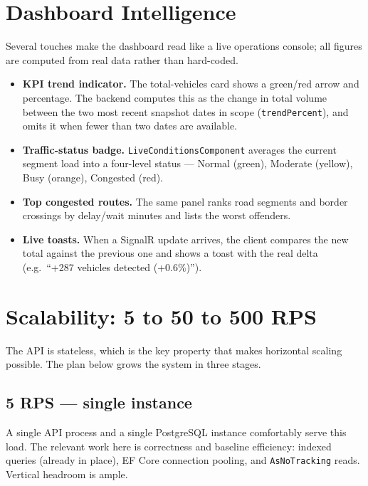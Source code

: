 \documentclass[11pt,a4paper]{article}
\newcommand{\code}[1]{\texttt{\small #1}}
\begin{document}
\section{Dashboard Intelligence}
Several touches make the dashboard read like a live operations console; all
figures are computed from real data rather than hard-coded.

\begin{itemize}[noitemsep]
  \item \textbf{KPI trend indicator.} The total-vehicles card shows a green/red
        arrow and percentage. The backend computes this as the change in total
        volume between the two most recent snapshot dates in scope
        (\code{trendPercent}), and omits it when fewer than two dates are
        available.
  \item \textbf{Traffic-status badge.} \code{LiveConditionsComponent} averages
        the current segment load into a four-level status --- Normal (green),
        Moderate (yellow), Busy (orange), Congested (red).
  \item \textbf{Top congested routes.} The same panel ranks road segments and
        border crossings by delay/wait minutes and lists the worst offenders.
  \item \textbf{Live toasts.} When a SignalR update arrives, the client compares
        the new total against the previous one and shows a toast with the real
        delta (e.g.\ ``+287 vehicles detected (+0.6\%)'').
\end{itemize}

\section{Scalability: 5 to 50 to 500 RPS}
The API is stateless, which is the key property that makes horizontal scaling
possible. The plan below grows the system in three stages.

\subsection{5 RPS --- single instance}
A single API process and a single PostgreSQL instance comfortably serve this
load. The relevant work here is correctness and baseline efficiency: indexed
queries (already in place), EF Core connection pooling, and \code{AsNoTracking}
reads. Vertical headroom is ample.
\end{document}
